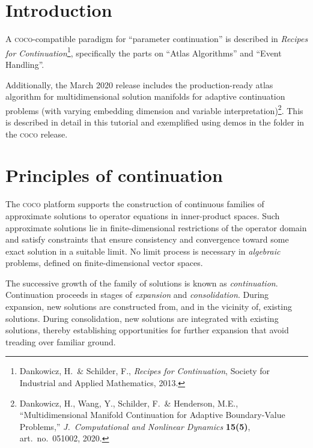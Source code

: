  

\section{Introduction}
A \textsc{coco}-compatible paradigm for ``parameter continuation'' is described in \emph{Recipes for Continuation}\footnote{Dankowicz, H.~\& Schilder, F., \emph{Recipes for Continuation}, Society for Industrial and Applied Mathematics, 2013.}, specifically the parts on ``Atlas Algorithms'' and ``Event Handling''.

Additionally, the March 2020 release includes the production-ready  atlas algorithm for multidimensional solution manifolds for adaptive continuation problems (with varying embedding dimension and variable interpretation)\footnote{Dankowicz, H., Wang, Y., Schilder, F.~\& Henderson, M.E., ``Multidimensional Manifold Continuation for Adaptive Boundary-Value Problems,'' \emph{J.~Computational and Nonlinear Dynamics} \textbf{15(5)}, art.~no.~051002, 2020.}. This is described in detail in this tutorial and exemplified using demos in the  folder in the \textsc{coco} release.

\section{Principles of continuation}
\label{chap: fsm}

The \textsc{coco} platform supports the construction of continuous families of approximate solutions to operator equations in inner-product spaces. Such approximate solutions lie in finite-dimensional restrictions of the operator domain and satisfy constraints that ensure consistency and convergence toward some exact solution in a suitable limit. No limit process is necessary in \emph{algebraic} problems, defined on finite-dimensional vector spaces.

The successive growth of the family of solutions is known as \emph{continuation}. Continuation proceeds in stages of \emph{expansion} and \emph{consolidation}. During expansion, new solutions are constructed from, and in the vicinity of, existing solutions. During consolidation, new solutions are integrated with existing solutions, thereby establishing opportunities for further expansion that avoid treading over familiar ground. 

